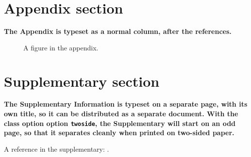 \documentclass[twocolumn]{article}
\begin{document}

\normalsize

\emergencystretch 4pt   %
\printbibliography
\emergencystretch 2pt   %


\appendix

\section{Appendix section}
\label{sec:appendix}

\textbf{The Appendix is typeset as a normal column, after the references.}

\lipsum[2]

\lipsum[3]

\begin{figure}
  \centering
  \fbox{\rule[-.5cm]{4cm}{4cm} \rule[-.5cm]{4cm}{0cm}}
  \caption{A figure in the appendix.}
  \label{fig:appfig1}
\end{figure}

\lipsum[2]


\supplementary
\newrefsection  %

\section{Supplementary section}

\textbf{The Supplementary Information is typeset on a separate page, with its own title, so it can be distributed as a separate document.
With the class option option \texttt{twoside}, the Supplementary will start on an odd page,
so that it separates cleanly when printed on two-sided paper.}

A reference in the supplementary: \cite{kour2014fast}.

\lipsum[2]

\lipsum[3]

\lipsum[2]
\end{document}
